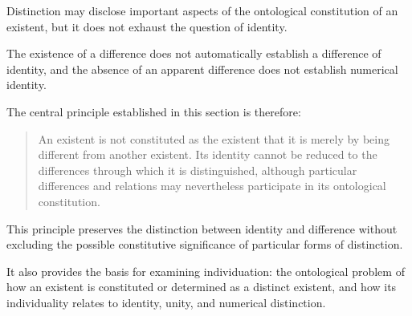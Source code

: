 Distinction may disclose important aspects
of the ontological constitution of an existent,
but it does not exhaust the question of
identity.

The existence of a difference does not
automatically establish a difference of
identity, and the absence of an apparent
difference does not establish numerical
identity.

The central principle established in this
section is therefore:

\begin{quote}
An existent is not constituted as the
existent that it is merely by being
different from another existent. Its
identity cannot be reduced to the
differences through which it is
distinguished, although particular
differences and relations may
nevertheless participate in its
ontological constitution.
\end{quote}

This principle preserves the distinction
between identity and difference without
excluding the possible constitutive
significance of particular forms of
distinction.

It also provides the basis for examining
individuation: the ontological problem
of how an existent is constituted or
determined as a distinct existent, and
how its individuality relates to identity,
unity, and numerical distinction.

